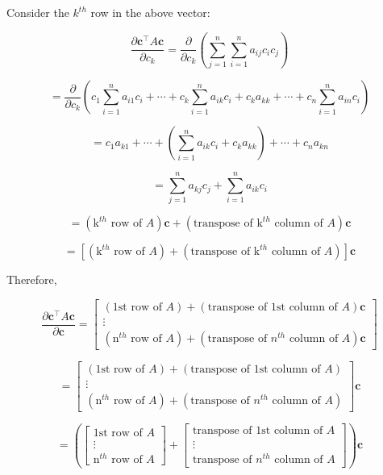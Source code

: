 \documentclass[12pt]{article}
\begin{document}
\begin{enumerate}
Consider the \( k^{th} \) row in the above vector:

\[
\frac{\partial \mathbf{c}^\top A \mathbf{c}}{\partial c_k}
= \frac{\partial}{\partial c_k} \left( \sum\limits_{j=1}^{n} \sum\limits_{i=1}^{n} a_{ij} c_i c_j \right)
\]

\[
= \frac{\partial}{\partial c_k} \left( c_1 \sum\limits_{i=1}^{n} a_{i1} c_i + \cdots + c_k \sum\limits_{i=1}^{n} a_{ik} c_i + c_k a_{kk} + \cdots + c_n \sum\limits_{i=1}^{n} a_{in} c_i \right)
\]

\[
= c_1 a_{k1} + \cdots + \left( \sum\limits_{i=1}^{n} a_{ik} c_i + c_k a_{kk} \right) + \cdots + c_n a_{kn}
\]

\[
= \sum\limits_{j=1}^{n} a_{kj} c_j + \sum\limits_{i=1}^{n} a_{ik} c_i
\]

\[
= (\text{k}^{th} \text{ row of } A) \mathbf{c} + (\text{transpose of } \text{k}^{th} \text{ column of } A) \mathbf{c}
\]

\[
= \left[ (\text{k}^{th} \text{ row of } A) + (\text{transpose of } \text{k}^{th} \text{ column of } A) \right] \mathbf{c}
\]

Therefore,

\[
\frac{\partial \mathbf{c}^\top A \mathbf{c}}{\partial \mathbf{c}} =
\begin{bmatrix}
(\text{1st row of } A) + (\text{transpose of 1st column of } A) \mathbf{c} \\
\vdots \\
(\text{n}^{th} \text{ row of } A) + (\text{transpose of } n^{th} \text{ column of } A) \mathbf{c}
\end{bmatrix}
\]

\[
=
\begin{bmatrix}
(\text{1st row of } A) + (\text{transpose of 1st column of } A) \\
\vdots \\
(\text{n}^{th} \text{ row of } A) + (\text{transpose of } n^{th} \text{ column of } A)
\end{bmatrix} \mathbf{c}
\]

\[
=
\left( 
\begin{bmatrix}
\text{1st row of } A \\
\vdots \\
\text{n}^{th} \text{ row of } A
\end{bmatrix} 
+ 
\begin{bmatrix}
\text{transpose of 1st column of } A \\
\vdots \\
\text{transpose of } n^{th} \text{ column of } A
\end{bmatrix} 
\right) \mathbf{c}
\]


\end{enumerate}
\end{document}
